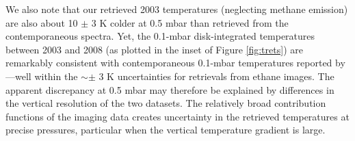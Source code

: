 \documentclass[twocolumn,10pt]{aastex631}
\begin{document}


We also note that our retrieved 2003 temperatures (neglecting methane emission) are also about 10 $\pm$ 3 K colder at 0.5 mbar than \citet{fletcher2014neptune} retrieved from the contemporaneous spectra. Yet, the 0.1-mbar disk-integrated temperatures between 2003 and 2008 (as plotted in the inset of Figure \ref{fig:trets}) are remarkably consistent with contemporaneous 0.1-mbar temperatures reported by \citet{fletcher2014neptune}---well within the $\sim\pm$ 3 K uncertainties for retrievals from ethane images.  The apparent discrepancy at 0.5 mbar may therefore be explained by differences in the vertical resolution of the two datasets. The relatively broad contribution functions of the imaging data creates uncertainty in the retrieved temperatures at precise pressures, particular when the vertical temperature gradient is large.




\end{document}
